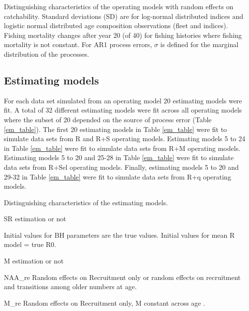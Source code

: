 \documentclass[
  12pt,
]{article}
\begin{document}
\begin{landscape}
\begin{table}
\caption{Distinguishing characteristics of the operating models with random effects on catchability. Standard deviations (SD) are for log-normal distributed indices and logistic normal distributed age composition observations (fleet and indices). Fishing mortality changes after year 20 (of 40) for fishing histories where fishing mortality is not constant. For AR1 process errors, $\sigma$ is defined for the marginal distribution of the processes.}\label{q_om_table}
{}
\end{table}
\end{landscape}

\hypertarget{estimating-models}{%
\subsection*{Estimating models}\label{estimating-models}}

For each data set simulated from an operating model 20 estimating models
were fit. A total of 32 different estimating models were fit across all
operating models where the subset of 20 depended on the source of
process error (Table \ref{em_table}). The first 20 estimating models in
Table \ref{em_table} were fit to simulate data sets from R and R+S
operating models. Estimating models 5 to 24 in Table \ref{em_table} were
fit to simulate data sets from R+M operating models. Estimating models 5
to 20 and 25-28 in Table \ref{em_table} were fit to simulate data sets
from R+Sel operating models. Finally, estimating models 5 to 20 and
29-32 in Table \ref{em_table} were fit to simulate data sets from R+q
operating models.

\begin{table}
\caption{Distinguishing characteristics of the estimating models.}\label{em_table}
{\scriptsize }
\end{table}

SR estimation or not

Initial values for BH parameters are the true values. Initial values for
mean R model = true R0.

M estimation or not

NAA\_re Random effects on Recruitment only or random effects on
recruitment and transitions among older numbers at age.

M\_re Random effects on Recruitment only, M constant across age .
\end{document}
